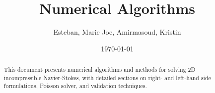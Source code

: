 \documentclass[11pt]{article}
\title{\textbf{Numerical Algorithms}}
\author{Esteban, Marie Joe, Amirmasoud, Kristin}
\date{\today}
\theoremstyle{plain}
\theoremstyle{definition}
\theoremstyle{remark}
\begin{document}
\maketitle
\begin{abstract}
This document presents numerical algorithms and methods for solving 2D incompressible Navier-Stokes, with detailed sections on right- and left-hand side formulations, Poisson solver, and validation techniques.
\end{abstract}











% 


\end{document}
